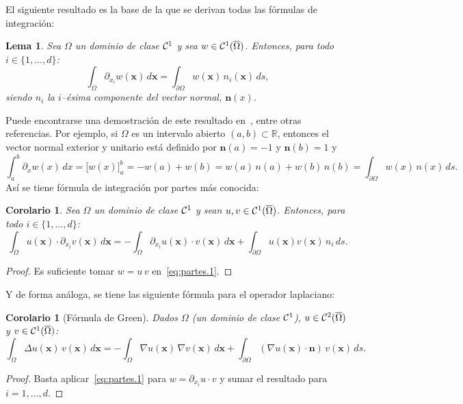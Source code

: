 \documentclass[11pt]{report}
\theoremstyle{plain}
\newtheorem{lemma}[theorem]{Lema}
\newtheorem{corolary}[theorem]{Corolario}
\theoremstyle{definition}
\newcommand{\deff}[1]{\textit{\textbf{#1}}}
\newcommand{\R}{\ensuremath{\mathbb{R}}}
\newcommand{\xx}{\ensuremath{\mathbf{x}}\xspace}
\newcommand{\ff}{\ensuremath{\mathbf{f}}\xspace}
\newcommand{\nn}{\ensuremath{\mathbf{n}}\xspace}
\renewcommand{\div}{\ensuremath{\nabla\cdot}}
\newcommand{\classC}[2]{%
  \ensuremath{
   \ifthenelse{\equal{#2}{}}
    {\mathcal{C}^{#1}}
    {\mathcal{C}^{#1}(#2)}
  }
}
\begin{document}
El siguiente resultado es la base de la que se derivan todas las fórmulas de integración:
\begin{lemma}
  Sea $\Omega$ un dominio de clase $\classC1{}$ y sea $w\in \classC1{\overline\Omega}$. Entonces, para todo $i\in \{1,\dots,d\}$:
	\begin{equation}
		\label{eq:partes.1}
		\int_\Omega \partial_{x_i} w(\xx) \, d\xx =
		\int_{\partial\Omega} w(\xx)\,n_i(\xx) \, ds,
	\end{equation}
	siendo $n_i$ la $i$--ésima componente del vector normal, $\nn(x)$.
\end{lemma}
Puede encontrarse una demostración de este resultado en~\cite{sayas2019variational}, entre otras referencias.
Por ejemplo, si $\Omega$ es un intervalo abierto $(a,b)\subset\R$, entonces el vector normal exterior y unitario está definido por $\nn(a)=-1$ y $\nn(b)=1$ y
$$
	\int_a^b \partial_{x} w(x) \, dx =
	\big[ w(x) \big]_{a}^b = - w(a) + w(b) = w(a)\, n(a) + w(b)\, n(b) =
	\int_{\partial\Omega} w(x)\,n(x) \, ds.
$$
Así se tiene fórmula de integración por partes más conocida:
\begin{corolary}
  Sea $\Omega$ un dominio de clase $\classC1{}$ y sean $u, v\in \classC1{\overline\Omega}$. Entonces, para todo $i\in \{1,\dots,d\}$:
	\begin{equation}
		\label{eq:partes.2}
		\int_\Omega u(\xx)\cdot \partial_{x_i}v(\xx) \, d\xx =
		- \int_\Omega \partial_{x_i}u(\xx)\cdot v(\xx) \, d\xx
		+ \int_{\partial\Omega} u(\xx)v(\xx)\,n_i \, ds.
	\end{equation}
\end{corolary}
\begin{proof}
	Es suficiente tomar $w=u\,v$ en~\eqref{eq:partes.1}.
\end{proof}
Y de forma análoga, se tiene las siguiente fórmula para el operador laplaciano:
\begin{corolary}[Fórmula de Green]
  Dados $\Omega$ (un dominio de clase $\classC1{}$), $u \in \classC2{\overline\Omega}$ y $v\in\classC1{\overline\Omega}$:
	\begin{equation}
		\label{eq:green}
		\int_\Omega \Delta u(\xx)\, v(\xx) \, d\xx =
		- \int_\Omega \nabla u(\xx)\, \nabla v(\xx) \, d\xx
		+ \int_{\partial\Omega} (\nabla u(\xx)\cdot\nn)\, v(\xx)  \, ds.
	\end{equation}
\end{corolary}
\begin{proof}
	Basta aplicar~\eqref{eq:partes.1} para $w=\partial_{x_i} u \cdot v$ y sumar el resultado para $i=1,\dots, d$.
\end{proof}
\end{document}
